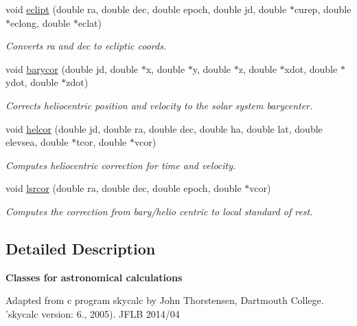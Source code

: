 \begin{DoxyCompactItemize}
void \hyperlink{class_astronomy_ad132dee2b16c6b76638f5173cbb8cb34}{eclipt} (double ra, double dec, double epoch, double jd, double $\ast$curep, double $\ast$eclong, double $\ast$eclat)
\begin{DoxyCompactList}\small\item\em Converts ra and dec to ecliptic coords. \end{DoxyCompactList}\item 
void \hyperlink{class_astronomy_a749844378c3f3ec5500ead278714652b}{barycor} (double jd, double $\ast$x, double $\ast$y, double $\ast$z, double $\ast$xdot, double $\ast$ydot, double $\ast$zdot)
\begin{DoxyCompactList}\small\item\em Corrects heliocentric position and velocity to the solar system barycenter. \end{DoxyCompactList}\item 
void \hyperlink{class_astronomy_a015931eeff31f25b8df6b9abb41e9364}{helcor} (double jd, double ra, double dec, double ha, double lat, double elevsea, double $\ast$tcor, double $\ast$vcor)
\begin{DoxyCompactList}\small\item\em Computes heliocentric correction for time and velocity. \end{DoxyCompactList}\item 
void \hyperlink{class_astronomy_a710c0b364fa35a9446dd78d6520cff4d}{lsrcor} (double ra, double dec, double epoch, double $\ast$vcor)
\begin{DoxyCompactList}\small\item\em Computes the correction from bary/helio centric to local standard of rest. \end{DoxyCompactList}\end{DoxyCompactItemize}


\subsection{Detailed Description}
{\bfseries Classes for astronomical calculations} 

Adapted from c program skycalc by John Thorstensen, Dartmouth College. 'skycalc version\-: 6., 2005). J\-F\-L\-B 2014/04 


